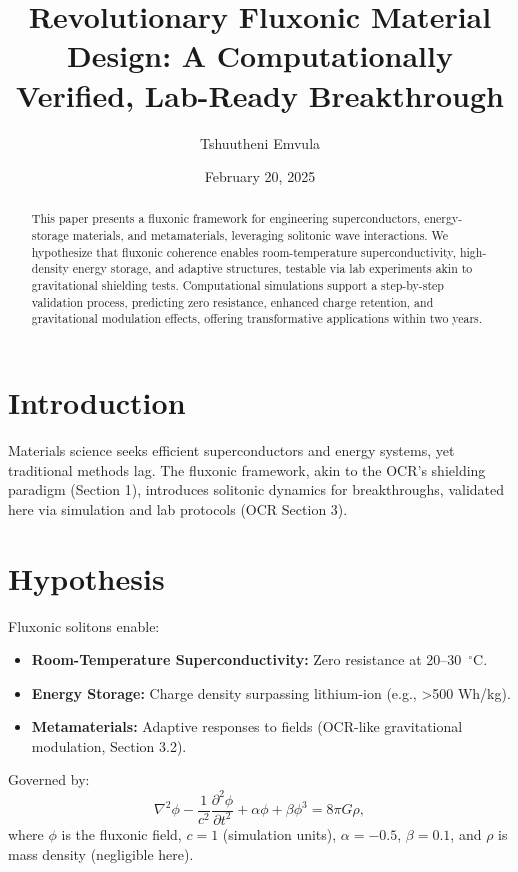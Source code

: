 \documentclass{article}
\title{Revolutionary Fluxonic Material Design: A Computationally Verified, Lab-Ready Breakthrough}
\author{Tshuutheni Emvula}
\date{February 20, 2025}
\begin{document}
\maketitle

\begin{abstract}
This paper presents a fluxonic framework for engineering superconductors, energy-storage materials, and metamaterials, leveraging solitonic wave interactions. We hypothesize that fluxonic coherence enables room-temperature superconductivity, high-density energy storage, and adaptive structures, testable via lab experiments akin to gravitational shielding tests. Computational simulations support a step-by-step validation process, predicting zero resistance, enhanced charge retention, and gravitational modulation effects, offering transformative applications within two years.
\end{abstract}

\section{Introduction}
Materials science seeks efficient superconductors and energy systems, yet traditional methods lag. The fluxonic framework, akin to the OCR’s shielding paradigm (Section 1), introduces solitonic dynamics for breakthroughs, validated here via simulation and lab protocols (OCR Section 3).

\section{Hypothesis}
Fluxonic solitons enable:
\begin{itemize}
    \item \textbf{Room-Temperature Superconductivity:} Zero resistance at 20--30~$^\circ$C.
    \item \textbf{Energy Storage:} Charge density surpassing lithium-ion (e.g., >500 Wh/kg).
    \item \textbf{Metamaterials:} Adaptive responses to fields (OCR-like gravitational modulation, Section 3.2).
\end{itemize}
Governed by:
\begin{equation}
\nabla^2 \phi - \frac{1}{c^2} \frac{\partial^2 \phi}{\partial t^2} + \alpha \phi + \beta \phi^3 = 8 \pi G \rho,
\end{equation}
where \(\phi\) is the fluxonic field, \(c = 1\) (simulation units), \(\alpha = -0.5\), \(\beta = 0.1\), and \(\rho\) is mass density (negligible here).
\end{document}
